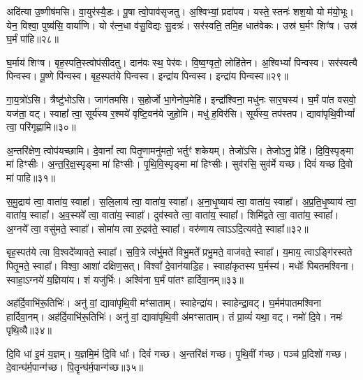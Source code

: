 अदि॑त्या उ॒ष्णीष॑मसि। 
वा॒युर॑स्यै॒डः। 
पू॒षा त्वो॒पाव॑सृजतु। 
अ॒श्विभ्यां॒ प्रदा॑पय। 
यस्ते॒ स्तनः॑ शश॒यो यो म॑यो॒भूः। 
येन॒ विश्वा॒ पुष्य॑सि॒ वार्या॑णि। 
यो र॑त्न॒धा व॑सु॒विद्यः सु॒दत्रः॑। 
सर॑स्वति॒ तमि॒ह धात॑वेकः। 
उस्र॑ घ॒र्मꣳ शिꣳ॑ष। 
उस्र॑ घ॒र्मं पा॑हि॥२८॥

घ॒र्माय॑ शिꣳष। 
बृह॒स्पति॒स्त्वोप॑सीदतु। 
दान॑वः स्थ॒ पेर॑वः। 
वि॒ष्व॒ग्वृतो॒ लोहि॑तेन। 
अ॒श्विभ्यां᳚ पिन्वस्व। 
सर॑स्वत्यै पिन्वस्व। 
पू॒ष्णे पि॑न्वस्व। 
बृह॒स्पत॑ये पिन्वस्व। 
इन्द्रा॑य पिन्वस्व। 
इन्द्रा॑य पिन्वस्व॥२९॥

गा॒य॒त्रो॑ऽसि। 
त्रैष्टु॑भोऽसि। 
जाग॑तमसि। 
स॒होर्जो भा॒गेनोप॒मेहि॑। 
इन्द्रा᳚श्विना॒ मधु॑नः सार॒घस्य॑। 
घ॒र्मं पा॑त वसवो॒ यज॑ता॒ वट्। 
स्वाहा᳚ त्वा॒ सूर्य॑स्य र॒श्मये॑ वृष्टि॒वन॑ये जुहोमि। 
मधु॑ ह॒विर॑सि। 
सूर्य॑स्य॒ तप॑स्तप। 
द्यावा॑पृथि॒वीभ्यां᳚ त्वा॒ परि॑गृह्णामि॥३०॥

अ॒न्तरि॑क्षेण॒ त्वोप॑यच्छामि। 
दे॒वानां᳚ त्वा पितृ॒णामनु॑मतो॒ भर्तुꣳ॑ शकेयम्। 
तेजो॑ऽसि। 
तेजोऽनु॒ प्रेहि॑। 
दि॒वि॒स्पृङ्मा मा॑ हिꣳसीः। 
अ॒न्त॒रि॒क्ष॒स्पृङ्मा मा॑ हिꣳसीः। 
पृ॒थि॒वि॒स्पृङ्मा मा॑ हिꣳसीः। 
सुव॑रसि॒ सुव॑र्मे यच्छ। 
दिवं॑ यच्छ दि॒वो मा॑ पाहि॥३१॥
\anuvakamend[एहि॑ पाहि पिन्वस्व गृह्णामि॒ नव॑ च]

स॒मु॒द्राय॑ त्वा॒ वाता॑य॒ स्वाहा᳚। 
स॒लि॒लाय॑ त्वा॒ वाता॑य॒ स्वाहा᳚। 
अ॒ना॒धृ॒ष्याय॑ त्वा॒ वाता॑य॒ स्वाहा᳚। 
अ॒प्र॒ति॒धृ॒ष्याय॑ त्वा॒ वाता॑य॒ स्वाहा᳚। 
अ॒व॒स्यवे᳚ त्वा॒ वाता॑य॒ स्वाहा᳚। 
दुव॑स्वते त्वा॒ वाता॑य॒ स्वाहा᳚। 
शिमि॑द्वते त्वा॒ वाता॑य॒ स्वाहा᳚। 
अ॒ग्नये᳚ त्वा॒ वसु॑मते॒ स्वाहा᳚। 
सोमा॑य त्वा रु॒द्रव॑ते॒ स्वाहा᳚। 
वरु॑णाय त्वाऽऽदि॒त्यव॑ते॒ स्वाहा᳚॥३२॥

बृह॒स्पत॑ये त्वा वि॒श्वदे᳚व्यावते॒ स्वाहा᳚। 
स॒वि॒त्रे त्व॑र्भु॒मते॑ विभु॒मते᳚ प्रभु॒मते॒ वाज॑वते॒ स्वाहा᳚। 
य॒माय॒ त्वाऽङ्गि॑रस्वते पितृ॒मते॒ स्वाहा᳚। 
विश्वा॒ आशा॑ दक्षिण॒सत्। 
विश्वां᳚ दे॒वान॑याडि॒ह। 
स्वाहा॑कृतस्य घ॒र्मस्य॑। 
मधोः᳚ पिबतमश्विना। 
स्वाहा॒ऽग्नये॑ य॒ज्ञिया॑य। 
शं यजु॑र्भिः। 
अश्वि॑ना घ॒र्मं पा॑तꣳ हार्दिवा॒नम्॥३३॥

अह॑र्दि॒वाभि॑रू॒तिभिः॑। 
अनु॑ वां॒ द्यावा॑पृथि॒वी मꣳ॑साताम्। 
स्वाहेन्द्रा॑य। 
स्वाहेन्द्रा॒वट्। 
घ॒र्मम॑पातमश्विना हार्दिवा॒नम्। 
अह॑र्दि॒वाभि॑रू॒तिभिः॑। 
अनु॑ वां॒ द्यावा॑पृथि॒वी अ॑मꣳसाताम्। 
तं प्रा॒व्यं॑ यथा॒ वट्। 
नमो॑ दि॒वे। 
नमः॑ पृथि॒व्यै॥३४॥

दि॒वि धा॑ इ॒मं य॒ज्ञम्। 
य॒ज्ञमि॒मं दि॒वि धाः᳚। 
दिवं॑ गच्छ। 
अ॒न्तरि॑क्षं गच्छ। 
पृ॒थि॒वीं ग॑च्छ। 
पञ्च॑ प्र॒दिशो॑ गच्छ। 
दे॒वान्घ॑र्म॒पान्ग॑च्छ। 
पि॒तॄन्घ॑र्म॒पान्ग॑च्छ॥३५॥
\anuvakamend[आ॒दि॒त्यव॑ते॒ स्वाहा॑ हार्दिवा॒नं पृ॑थि॒व्या अ॒ष्टौ च॑]

